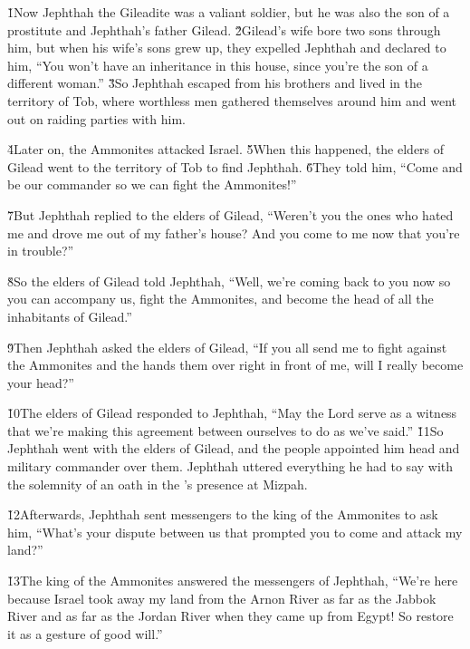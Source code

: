 \v{1}Now Jephthah the Gileadite was a valiant soldier, but he was also the son of a prostitute and Jephthah's father Gilead. \v{2}Gilead's wife bore two sons through him, but when his wife's sons grew up, they expelled Jephthah and declared to him, ``You won't have an inheritance in this house, since you're the son of a different woman.'' \v{3}So Jephthah escaped from his brothers and lived in the territory of Tob, where worthless men gathered themselves around him and went out on raiding parties with him.

\v{4}Later on, the Ammonites attacked Israel. \v{5}When this happened, the elders of Gilead went to the territory of Tob to find Jephthah. \v{6}They told him, ``Come and be our commander so we can fight the Ammonites!''

\v{7}But Jephthah replied to the elders of Gilead, ``Weren't you the ones who hated me and drove me out of my father's house? And you come to me now that you're in trouble?''

\v{8}So the elders of Gilead told Jephthah, ``Well, we're coming back to you now so you can accompany us, fight the Ammonites, and become the head of all the inhabitants of Gilead.''

\v{9}Then Jephthah asked the elders of Gilead, ``If you all send me to fight against the Ammonites and the  hands them over right in front of me, will I really become your head?''

\v{10}The elders of Gilead responded to Jephthah, ``May the Lord serve as a witness that we're making this agreement between ourselves to do as we've said.'' \v{11}So Jephthah went with the elders of Gilead, and the people appointed him head and military commander over them. Jephthah uttered everything he had to say with the solemnity of an oath in the 's presence at Mizpah.

\v{12}Afterwards, Jephthah sent messengers to the king of the Ammonites to ask him, ``What's your dispute between us that prompted you to come and attack my land?''

\v{13}The king of the Ammonites answered the messengers of Jephthah, ``We're here because Israel took away my land from the Arnon River as far as the Jabbok River and as far as the Jordan River when they came up from Egypt! So restore it as a gesture of good will.''

